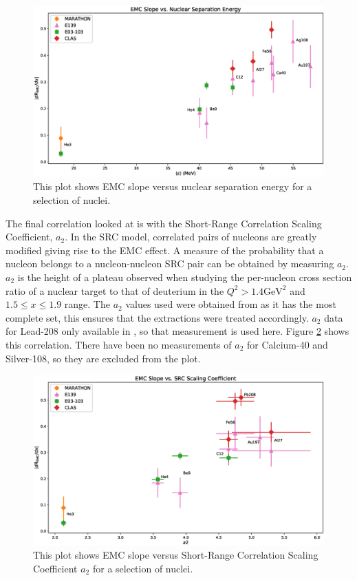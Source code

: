 \begin{figure}[p]
	\includegraphics[width=\textwidth]{./results/fig/EMC_vs_NSep.eps}
	\caption{This plot shows EMC slope versus nuclear separation energy for a selection of nuclei.}
	\label{fig:emc_v_nsep}
\end{figure}

The final correlation looked at is with the Short-Range Correlation Scaling Coefficient, $a_2$. In the SRC model, correlated pairs of nucleons are greatly modified giving rise to the EMC effect. A measure of the probability that a nucleon belongs to a nucleon-nucleon SRC pair can be obtained by measuring $a_2$. $a_2$ is the height of a plateau observed when studying the per-nucleon cross section ratio of a nuclear target to that of deuterium in the $Q^2 > 1.4 \text{GeV}^2$ and $1.5 \leq x \leq 1.9$ range. The $a_2$ values used were obtained from \cite{arrington_src} as it has the most complete set, this ensures that the extractions were treated accordingly. $a_2$ data for Lead-208 only available in \cite{clas_emc}, so that measurement is used here. Figure \ref{fig:emc_v_a2} shows this correlation. There have been no measurements of $a_2$ for Calcium-40 and Silver-108, so they are excluded from the plot.

\begin{figure}[p]
	\includegraphics[width=\textwidth]{./results/fig/EMC_vs_a2.eps}
	\caption{This plot shows EMC slope versus Short-Range Correlation Scaling Coefficient $a_2$ for a selection of nuclei.}
	\label{fig:emc_v_a2}
\end{figure}